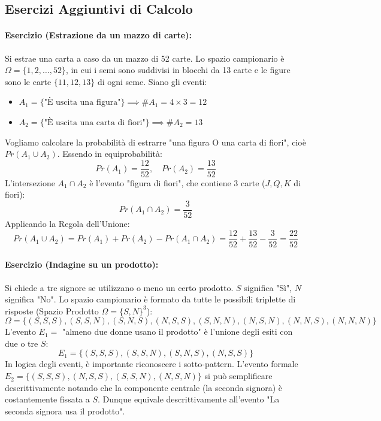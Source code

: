 \documentclass[12pt, a4paper]{article}
\begin{document}
\subsection{Esercizi Aggiuntivi di Calcolo}

\paragraph{Esercizio (Estrazione da un mazzo di carte):}
Si estrae una carta a caso da un mazzo di 52 carte. Lo spazio campionario è $\Omega = \{1, 2, \dots, 52\}$, in cui i semi sono suddivisi in blocchi da 13 carte e le figure sono le carte $\{11, 12, 13\}$ di ogni seme.
Siano gli eventi:
\begin{itemize}
    \item $A_1 = \{\text{"È uscita una figura"}\} \implies \#A_1 = 4 \times 3 = 12$
    \item $A_2 = \{\text{"È uscita una carta di fiori"}\} \implies \#A_2 = 13$
\end{itemize}
Vogliamo calcolare la probabilità di estrarre "una figura O una carta di fiori", cioè $Pr(A_1 \cup A_2)$.
Essendo in equiprobabilità:
$$ Pr(A_1) = \frac{12}{52}, \quad Pr(A_2) = \frac{13}{52} $$
L'intersezione $A_1 \cap A_2$ è l'evento "figura di fiori", che contiene 3 carte ($J, Q, K$ di fiori):
$$ Pr(A_1 \cap A_2) = \frac{3}{52} $$
Applicando la Regola dell'Unione:
$$ Pr(A_1 \cup A_2) = Pr(A_1) + Pr(A_2) - Pr(A_1 \cap A_2) = \frac{12}{52} + \frac{13}{52} - \frac{3}{52} = \frac{22}{52} $$

\paragraph{Esercizio (Indagine su un prodotto):}
Si chiede a tre signore se utilizzano o meno un certo prodotto. $S$ significa "Sì", $N$ significa "No".
Lo spazio campionario è formato da tutte le possibili triplette di risposte (Spazio Prodotto $\Omega = \{S, N\}^3$):
$$ \Omega = \{(S,S,S), (S,S,N), (S,N,S), (N,S,S), (S,N,N), (N,S,N), (N,N,S), (N,N,N)\} $$
L'evento $E_1 =$ "almeno due donne usano il prodotto" è l'unione degli esiti con due o tre $S$:
$$ E_1 = \{(S,S,S), (S,S,N), (S,N,S), (N,S,S)\} $$
In logica degli eventi, è importante riconoscere i sotto-pattern. L'evento formale $E_2 = \{(S,S,S), (N,S,S), (S,S,N), (N,S,N)\}$ si può semplificare descrittivamente notando che la componente centrale (la seconda signora) è costantemente fissata a $S$. Dunque equivale descrittivamente all'evento "La seconda signora usa il prodotto".
\end{document}
